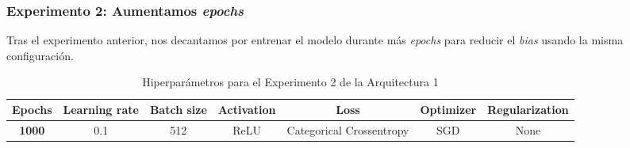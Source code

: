 \documentclass{article}
\begin{document}
		\subsubsection{Experimento 2: Aumentamos \textit{epochs}}
		\label{d-s-a1-e2}
			Tras el experimento anterior, nos decantamos por entrenar el modelo durante m\'as \textit{epochs} para reducir el \textit{bias} usando la misma configuraci\'on.\\
			\begin{table}[!h]
				\begin{center}
					\begin{tabular}{| c | c | c | c | c | c | c |}
						\textbf{Epochs} & \textbf{Learning rate} & \textbf{Batch size} & \textbf{Activation} & \textbf{Loss} & \textbf{Optimizer} & \textbf{Regularization} \\ \hline
						\textbf{1000} & 0.1 & 512 & ReLU & Categorical Crossentropy & SGD & None
					\end{tabular}
					\caption{Hiperpar\'ametros para el Experimento 2 de la Arquitectura 1}
					\label{tab:hip-d-a1-e2}
				\end{center}
			\end{table}
			
\end{document}
